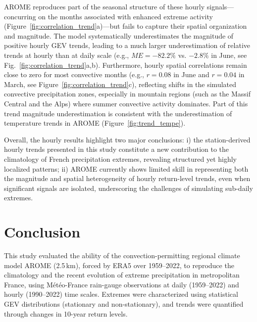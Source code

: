 \documentclass[hess, manuscript]{copernicus}
\begin{document}
AROME reproduces part of the seasonal structure of these hourly signals---concurring on the months associated with enhanced extreme activity (Figure~\ref{fig:correlation_trend}a)---but fails to capture their spatial organization and magnitude. The model systematically underestimates the magnitude of positive hourly GEV trends, leading to a much larger underestimation of relative trends at hourly than at daily scale (e.g., $ME = -82.2\%$ vs. $-2.8\%$ in June, see Fig.~\ref{fig:correlation_trend}a,b). Furthermore, hourly spatial correlations remain close to zero for most convective months (e.g., $r = 0.08$ in June and $r = 0.04$ in March, see Figure~\ref{fig:correlation_trend}c), reflecting shifts in the simulated convective precipitation zones, especially in mountain regions (such as the Massif Central and the Alps) where summer convective activity dominates. Part of this trend magnitude underestimation is consistent with the underestimation of temperature trends in AROME (Figure~\ref{fig:trend_tempe}). 

Overall, the hourly results highlight two major conclusions: i) the station-derived hourly trends presented in this study constitute a new contribution to the climatology of French precipitation extremes, revealing structured yet highly localized patterns; ii) AROME currently shows limited skill in representing both the magnitude and spatial heterogeneity of hourly return-level trends, even when significant signals are isolated, underscoring the challenges of simulating sub-daily extremes.

\section{Conclusion}\label{conclusion}

This study evaluated the ability of the convection-permitting regional climate model AROME (2.5\,km), forced by ERA5 over 1959--2022, to reproduce the climatology and the recent evolution of extreme precipitation in metropolitan France, using Météo-France rain-gauge observations at daily (1959--2022) and hourly (1990--2022) time scales. Extremes were characterized using statistical GEV distributions (stationary and non-stationary), and trends were quantified through changes in 10-year return levels.
\end{document}
